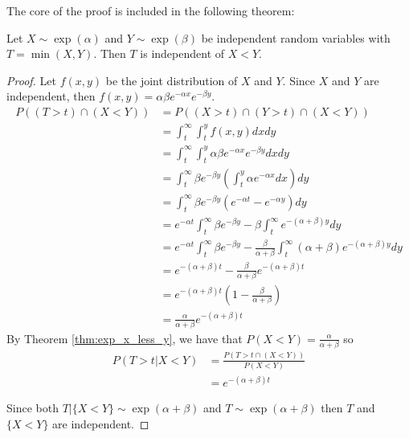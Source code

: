 The core of the proof is included in the following theorem:

\begin{theorem}
Let $X \sim \exp(\alpha)$ and $Y \sim \exp(\beta)$ be independent random variables with $T = \min(X,Y)$.
Then $T$ is independent of $X < Y$.
\end{theorem}

\begin{proof}
Let $f(x,y)$ be the joint distribution of $X$ and $Y$.
Since $X$ and $Y$ are independent, then $f(x,y) = \alpha \beta e^{-\alpha x} e^{-\beta y}$.
\begin{align*}
    P((T > t) \cap (X < Y)) &= P((X > t) \cap (Y > t) \cap (X < Y))\\
    &= \int_t^\infty \int_t^y f(x,y) dx dy\\
    &= \int_t^\infty \int_t^y \alpha \beta e^{-\alpha x} e^{-\beta y} dx dy\\
    &= \int_t^\infty \beta e^{-\beta y} \left(\int_t^y \alpha e^{-\alpha x} dx \right)  dy\\
    &= \int_t^\infty \beta e^{-\beta y} \left( e^{-\alpha t} - e^{-\alpha y} \right) dy\\
    &= e^{-\alpha t} \int_t^\infty \beta e^{-\beta y} - \beta \int_t^\infty e^{-(\alpha + \beta) y} dy\\
    &= e^{-\alpha t} \int_t^\infty \beta e^{-\beta y} - \frac{\beta}{\alpha + \beta} \int_t^\infty (\alpha + \beta) e^{-(\alpha + \beta) y} dy\\
    &= e^{-(\alpha + \beta) t} - \frac{\beta}{\alpha + \beta} e^{-(\alpha + \beta) t}\\
    &= e^{-(\alpha + \beta) t} \left(1 - \frac{\beta}{\alpha + \beta} \right)\\
    &= \frac{\alpha}{\alpha + \beta} e^{-(\alpha + \beta) t}
\end{align*}
By Theorem \ref{thm:exp_x_less_y}, we have that $P(X < Y) = \frac{\alpha}{\alpha + \beta}$ so
\begin{align*}
    P(T > t | X < Y) &= \frac{P(T > t \cap (X < Y))}{P(X < Y)}\\
    &= e^{-(\alpha + \beta) t}
\end{align*}

Since both $T | \{X < Y\} \sim \exp(\alpha + \beta)$ and $T \sim \exp(\alpha + \beta)$ then $T$ and $\{X < Y\}$ are independent.
\end{proof}


